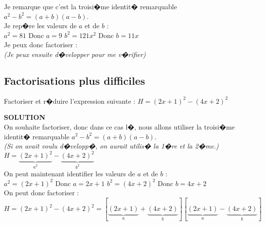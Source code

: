 \documentclass[a4paper,10pt,twoside,french]{article}
\begin{document}
Je remarque que c'est la troisi�me identit� remarquable $a^{2} - b^{2} = (a+b)(a-b)$.\\

Je rep�re les valeurs de $a$ et de $b$ : \\

$a^{2}= 81$ Donc $a=9$ \hspace*{1cm} $b^{2}= 121x^{2}$ Donc $b=11x$ \\

Je peux donc factoriser : \\
\textit{(Je peux ensuite d�velopper pour me v�rifier)
}

\color{black}

\vspace*{1cm}


\subsection{Factorisations plus difficiles}

\vspace*{0.5cm}


Factoriser et r�duire l'expression suivante : $ H = ( 2 x + 1 )^{2} - ( 4 x + 2 )^{2}$\\
\vspace*{0.5cm}


\color{red}
\textbf{SOLUTION}\\

On souhaite factoriser, donc dans ce cas l�, nous allons utiliser la troisi�me identit� remarquable $a^{2} - b^{2} = (a+b)(a-b)$. \\
\textit{(Si on avait voulu d�velopp�, on aurait utilis� la 1�re et la 2�me.)}\\

$ H = \underbrace{( 2 x + 1 )^{2}}_{a^{2}} - \underbrace{( 4 x + 2 )^{2}}_{b^{2}}$\\

On peut maintenant identifier les valeurs de $a$ et de $b$ :\\

$a^{2}= ( 2 x + 1 )^{2}$ Donc $a = 2x+1$  \hspace*{1.75cm} $b^{2}= ( 4 x + 2 )^{2}$ Donc $b = 4x+2$\\

On peut donc factoriser : $ H = ( 2 x + 1 )^{2} - ( 4 x + 2 )^{2}= [\underbrace{(2x+1)}_{a}+\underbrace{(4x+2)}_{b}][\underbrace{(2x+1)}_{a}-\underbrace{(4x+2)}_{b}]$\\
\end{document}
